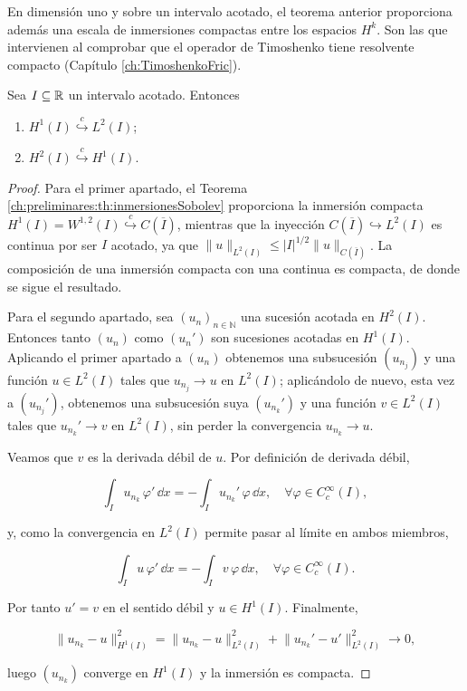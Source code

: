 En dimensión uno y sobre un intervalo acotado, el teorema anterior proporciona
además una escala de inmersiones compactas entre los espacios $H^k$. Son las que
intervienen al comprobar que el operador de Timoshenko tiene resolvente compacto
(Capítulo \ref{ch:TimoshenkoFric}).\\

\begin{Proposicion}
\label{ch:preliminares:prop:inmersionesCompactasIntervalo}

Sea $I \subseteq \mathbb{R}$ un intervalo acotado. Entonces

\begin{enumerate}
    \item $H^1(I) \overset{c}{\hookrightarrow} L^2(I)$;
    \item $H^2(I) \overset{c}{\hookrightarrow} H^1(I)$.
\end{enumerate}
\end{Proposicion}

\begin{proof}
Para el primer apartado, el Teorema \ref{ch:preliminares:th:inmersionesSobolev}
proporciona la inmersión compacta $H^1(I) = W^{1,2}(I) \overset{c}{\hookrightarrow} C(\overline{I})$,
mientras que la inyección $C(\overline{I}) \hookrightarrow L^2(I)$ es continua por ser
$I$ acotado, ya que $\lVert u \rVert_{L^2(I)} \leq |I|^{1/2} \lVert u \rVert_{C(\overline{I})}$.
La composición de una inmersión compacta con una continua es compacta, de donde se
sigue el resultado.

Para el segundo apartado, sea $(u_n)_{n \in \mathbb{N}}$ una sucesión acotada en
$H^2(I)$. Entonces tanto $(u_n)$ como $(u_n')$ son sucesiones acotadas en $H^1(I)$.
Aplicando el primer apartado a $(u_n)$ obtenemos una subsucesión $(u_{n_j})$ y una
función $u \in L^2(I)$ tales que $u_{n_j} \rightarrow u$ en $L^2(I)$; aplicándolo de
nuevo, esta vez a $(u_{n_j}')$, obtenemos una subsucesión suya $(u_{n_k}')$ y una
función $v \in L^2(I)$ tales que $u_{n_k}' \rightarrow v$ en $L^2(I)$, sin perder la
convergencia $u_{n_k} \rightarrow u$.

Veamos que $v$ es la derivada débil de $u$. Por definición de derivada débil,

\[\int_I u_{n_k} \, \varphi' \, \dd x = -\int_I u_{n_k}' \, \varphi \, \dd x, \quad \forall \varphi \in C_c^\infty(I),\]

y, como la convergencia en $L^2(I)$ permite pasar al límite en ambos miembros,

\[\int_I u \, \varphi' \, \dd x = -\int_I v \, \varphi \, \dd x, \quad \forall \varphi \in C_c^\infty(I).\]

Por tanto $u' = v$ en el sentido débil y $u \in H^1(I)$. Finalmente,

\[\lVert u_{n_k} - u \rVert_{H^1(I)}^2 = \lVert u_{n_k} - u \rVert_{L^2(I)}^2 + \lVert u_{n_k}' - u' \rVert_{L^2(I)}^2 \rightarrow 0,\]

luego $(u_{n_k})$ converge en $H^1(I)$ y la inmersión es compacta.
\end{proof}

